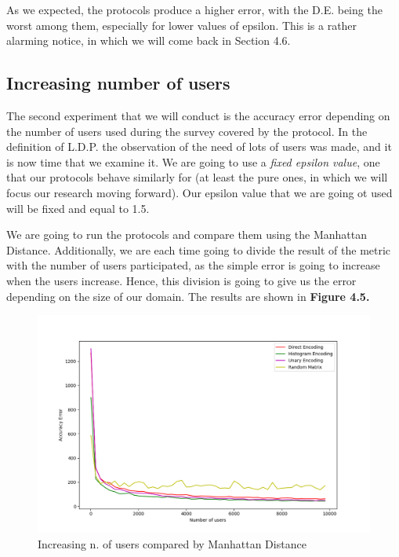 As we expected, the protocols produce a higher error, with the D.E. being the worst among them, especially for lower values of epsilon. This is a rather alarming notice, in which we will come back in Section 4.6.


\subsection{Increasing number of users}


The second experiment that we will conduct is the accuracy error depending on the number of users used during the survey covered by the protocol. In the definition of L.D.P. the observation of the need of lots of users was made, and it is now time that we examine it. We are going to use a \emph{fixed epsilon value}, one that our protocols behave similarly for (at least the pure ones, in which we will focus our research moving forward). Our epsilon value that we are going ot used will be fixed and equal to 1.5.

We are going to run the protocols and compare them using the Manhattan Distance. Additionally, we are each time going to divide the result of the metric with the number of users participated, as the simple error is going to increase when the users increase. Hence, this division is going to give us the error depending on the size of our domain. The results are shown in \textbf{Figure 4.5.}

\begin{figure}[!htb]\centering
    \includegraphics[width=1\textwidth]{images/nusers_others_l1.png}
    \caption{Increasing n. of users compared by Manhattan Distance}
\end{figure}

